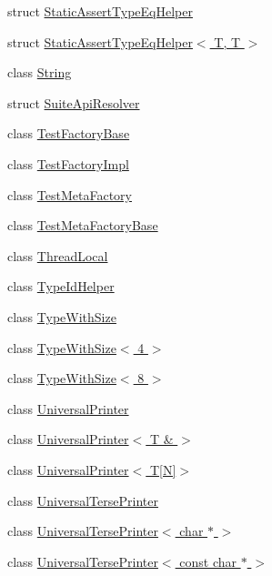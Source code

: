 \begin{DoxyCompactItemize}
\item 
struct \hyperlink{structtesting_1_1internal_1_1StaticAssertTypeEqHelper}{Static\+Assert\+Type\+Eq\+Helper}
\item 
struct \hyperlink{structtesting_1_1internal_1_1StaticAssertTypeEqHelper_3_01T_00_01T_01_4}{Static\+Assert\+Type\+Eq\+Helper$<$ T, T $>$}
\item 
class \hyperlink{classtesting_1_1internal_1_1String}{String}
\item 
struct \hyperlink{structtesting_1_1internal_1_1SuiteApiResolver}{Suite\+Api\+Resolver}
\item 
class \hyperlink{classtesting_1_1internal_1_1TestFactoryBase}{Test\+Factory\+Base}
\item 
class \hyperlink{classtesting_1_1internal_1_1TestFactoryImpl}{Test\+Factory\+Impl}
\item 
class \hyperlink{classtesting_1_1internal_1_1TestMetaFactory}{Test\+Meta\+Factory}
\item 
class \hyperlink{classtesting_1_1internal_1_1TestMetaFactoryBase}{Test\+Meta\+Factory\+Base}
\item 
class \hyperlink{classtesting_1_1internal_1_1ThreadLocal}{Thread\+Local}
\item 
class \hyperlink{classtesting_1_1internal_1_1TypeIdHelper}{Type\+Id\+Helper}
\item 
class \hyperlink{classtesting_1_1internal_1_1TypeWithSize}{Type\+With\+Size}
\item 
class \hyperlink{classtesting_1_1internal_1_1TypeWithSize_3_014_01_4}{Type\+With\+Size$<$ 4 $>$}
\item 
class \hyperlink{classtesting_1_1internal_1_1TypeWithSize_3_018_01_4}{Type\+With\+Size$<$ 8 $>$}
\item 
class \hyperlink{classtesting_1_1internal_1_1UniversalPrinter}{Universal\+Printer}
\item 
class \hyperlink{classtesting_1_1internal_1_1UniversalPrinter_3_01T_01_6_01_4}{Universal\+Printer$<$ T \& $>$}
\item 
class \hyperlink{classtesting_1_1internal_1_1UniversalPrinter_3_01T[N]_4}{Universal\+Printer$<$ T\mbox{[}\+N\mbox{]}$>$}
\item 
class \hyperlink{classtesting_1_1internal_1_1UniversalTersePrinter}{Universal\+Terse\+Printer}
\item 
class \hyperlink{classtesting_1_1internal_1_1UniversalTersePrinter_3_01char_01_5_01_4}{Universal\+Terse\+Printer$<$ char $\ast$ $>$}
\item 
class \hyperlink{classtesting_1_1internal_1_1UniversalTersePrinter_3_01const_01char_01_5_01_4}{Universal\+Terse\+Printer$<$ const char $\ast$ $>$}

\end{DoxyCompactItemize}
